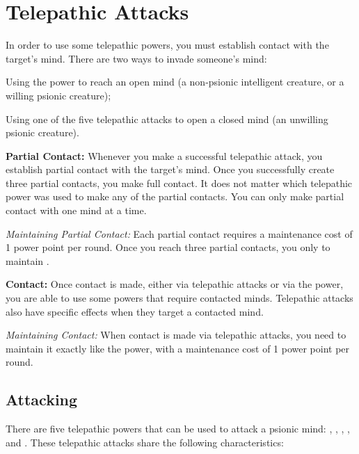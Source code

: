 \section{Telepathic Attacks}
In order to use some telepathic powers, you must establish contact with the target's mind. There are two ways to invade someone's mind:

\begin{itemize*}
	\item Using the  power to reach an open mind (a non-psionic intelligent creature, or a willing psionic creature);
	\item Using one of the five telepathic attacks to open a closed mind (an unwilling psionic creature).
\end{itemize*}

\textbf{Partial Contact:} Whenever you make a successful telepathic attack, you establish partial contact with the target's mind. Once you successfully create three partial contacts, you make full contact. It does not matter which telepathic power was used to make any of the partial contacts. You can only make partial contact with one mind at a time.

\textit{Maintaining Partial Contact:} Each partial contact requires a maintenance cost of 1 power point per round. Once you reach three partial contacts, you only to maintain . %

\textbf{Contact:} Once contact is made, either via telepathic attacks or via the  power, you are able to use some powers that require contacted minds. Telepathic attacks also have specific effects when they target a contacted mind.

\textit{Maintaining Contact:} When contact is made via telepathic attacks, you need to maintain it exactly like the  power, with a maintenance cost of 1 power point per round.

\subsection{Attacking}
There are five telepathic powers that can be used to attack a psionic mind: , , , , and . These telepathic attacks share the following characteristics:

